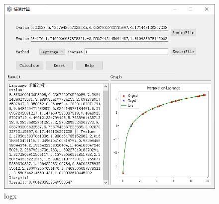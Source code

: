 \documentclass[UTF8]{ctexart}
\begin{document}
            \begin{figure}[htb]
                \centering
                \includegraphics[scale = 0.6]{logx.png}
                \caption{logx}
                \label{fig:测试5}
            \end{figure}
    
\end{document}
